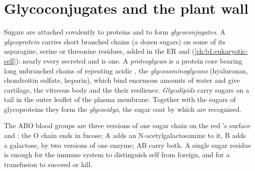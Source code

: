\section{Glycoconjugates and the plant wall}

\begin{definition}\label{def:b1:carbohydrates:glycoconjugate}
Sugars are attached covalently to proteins and  to form
\emph{glycoconjugates}. A \emph{glycoprotein}
carries short branched chains (a dozen sugars) on some of its
asparagine, serine or threonine residues, added in the ER and 
(\cref{ch:b1:eukaryotic-cell}): nearly every secreted and  is one. A \emph{proteoglycan} is a protein
core bearing long unbranched chains of repeating acidic ,
the \emph{glycosaminoglycans} (hyaluronan,
chondroitin sulfate, heparin), which bind enormous amounts of water and
give cartilage, the vitreous body and the  their
resilience. \emph{Glycolipids} carry sugars on a 
tail in the outer leaflet of the plasma membrane. Together with the
sugars of glycoproteins they form the \emph{glycocalyx},
the sugar coat by which  are recognised.
\end{definition}

\begin{example}\label{ex:b1:carbohydrates:abo}
The ABO blood groups are three versions of one sugar chain on the red
's surface  and : the O chain ends in
fucose; A adds an N-acetylgalactosamine to it, B adds a galactose, by
two versions of one enzyme; AB  carry both. A single sugar
residue is enough for the immune system to distinguish self from
foreign, and for a transfusion to succeed or kill.
\end{example}

